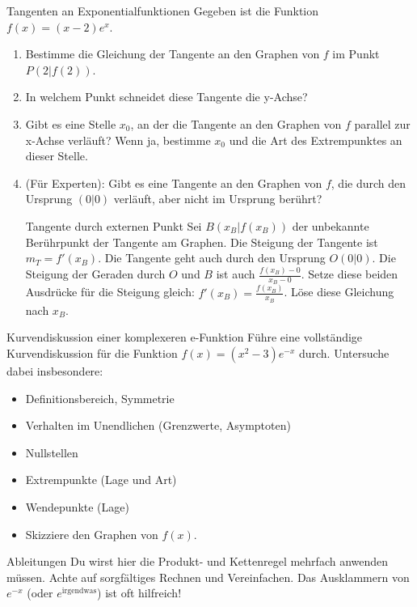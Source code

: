 \begin{aufgabenumgebung}{Tangenten an Exponentialfunktionen}
Gegeben ist die Funktion $f(x) = (x-2)e^x$.
\begin{enumerate}
    \item Bestimme die Gleichung der Tangente an den Graphen von $f$ im Punkt $P(2|f(2))$.
    \item In welchem Punkt schneidet diese Tangente die y-Achse?
    \item Gibt es eine Stelle $x_0$, an der die Tangente an den Graphen von $f$ parallel zur x-Achse verläuft? Wenn ja, bestimme $x_0$ und die Art des Extrempunktes an dieser Stelle.
    \item (Für Experten): Gibt es eine Tangente an den Graphen von $f$, die durch den Ursprung $(0|0)$ verläuft, aber nicht im Ursprung berührt?
        \begin{tippumgebung}{Tangente durch externen Punkt}
        Sei $B(x_B | f(x_B))$ der unbekannte Berührpunkt der Tangente am Graphen. Die Steigung der Tangente ist $m_T = f'(x_B)$. Die Tangente geht auch durch den Ursprung $O(0|0)$. Die Steigung der Geraden durch $O$ und $B$ ist auch $\frac{f(x_B)-0}{x_B-0}$. Setze diese beiden Ausdrücke für die Steigung gleich: $f'(x_B) = \frac{f(x_B)}{x_B}$. Löse diese Gleichung nach $x_B$.
        \end{tippumgebung}
\end{enumerate}
\end{aufgabenumgebung}

\begin{aufgabenumgebung}{Kurvendiskussion einer komplexeren e-Funktion}
Führe eine vollständige Kurvendiskussion für die Funktion $f(x) = (x^2 - 3)e^{-x}$ durch. Untersuche dabei insbesondere:
\begin{itemize}
    \item Definitionsbereich, Symmetrie
    \item Verhalten im Unendlichen (Grenzwerte, Asymptoten)
    \item Nullstellen
    \item Extrempunkte (Lage und Art)
    \item Wendepunkte (Lage)
    \item Skizziere den Graphen von $f(x)$.
\end{itemize}
\begin{tippumgebung}{Ableitungen}
Du wirst hier die Produkt- und Kettenregel mehrfach anwenden müssen. Achte auf sorgfältiges Rechnen und Vereinfachen. Das Ausklammern von $e^{-x}$ (oder $e^{\text{irgendwas}}$) ist oft hilfreich!
\end{tippumgebung}
\end{aufgabenumgebung}

